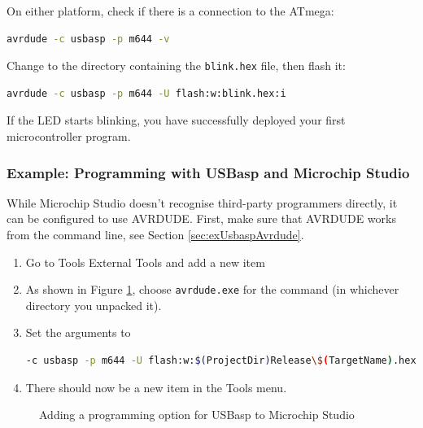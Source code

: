 \documentclass{article}
\newcommand{\file}[1]{\texttt{#1}}
\begin{document}
On either platform, check if there is a connection to the ATmega:
\begin{lstlisting}[language=bash]
avrdude -c usbasp -p m644 -v
\end{lstlisting}

Change to the directory containing the \file{blink.hex} file, then flash it:
\begin{lstlisting}[language=bash]
avrdude -c usbasp -p m644 -U flash:w:blink.hex:i
\end{lstlisting}

If the LED starts blinking, you have successfully deployed your first microcontroller program. 

\subsubsection{Example: Programming with USBasp and Microchip Studio}\label{sec:exMchpStudioProg}
While Microchip Studio doesn't recognise third-party programmers directly, it can be configured to use AVRDUDE. First, make sure that AVRDUDE works from the command line, see Section \ref{sec:exUsbaspAvrdude}. 

\begin{enumerate}
\item Go to Tools \textrightarrow{} External Tools and add a new item 
\item As shown in Figure \ref{fig:microchipStudioUSBasp}, choose \file{avrdude.exe} for the command (in whichever directory you unpacked it). 
\item Set the arguments to
\begin{lstlisting}[language=bash]
-c usbasp -p m644 -U flash:w:$(ProjectDir)Release\$(TargetName).hex:i
\end{lstlisting}
\item There should now be a new item in the Tools menu. 
\end{enumerate}

\begin{figure}[htb]
\centering
{}
\caption{Adding a programming option for USBasp to Microchip Studio}
\label{fig:microchipStudioUSBasp}
\end{figure}
\end{document}
